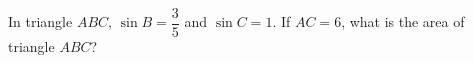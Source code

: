In triangle $ABC$, $\sin B=\dfrac35$ and $\sin C=1$. If $AC=6$, what is the area of triangle $ABC$?
